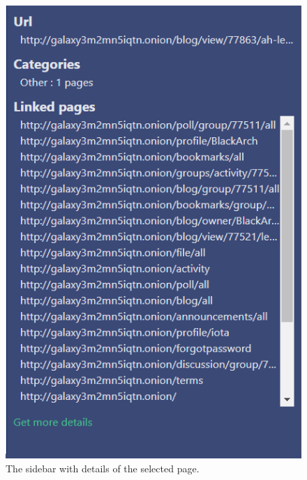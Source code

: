 \begin{figure}
\begin{minipage}[t]{0.45\textwidth}
    \includegraphics[width=\textwidth]{Images/page_sidebar.png}
    \caption{The sidebar with details of the selected page.}
    \label{sidebarPageDetails}
  \end{minipage} 
\end{figure}

